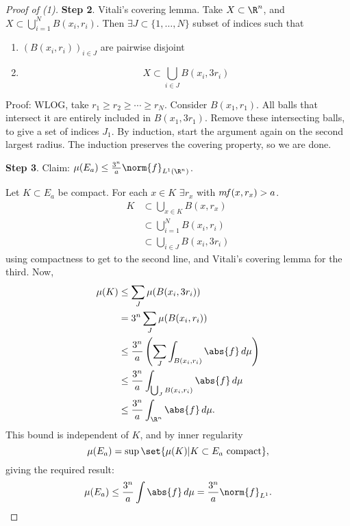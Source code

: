 \documentclass[twoside]{article}
\begin{document}
\begin{proof}[Proof of (1)]
    \textbf{Step 2}. Vitali's covering lemma.
    Take $X \subset \R^n$, and $X \subset \bigcup_{i=1}^N B(x_i, r_i)$.  Then $\exists J \subset \{1, \dotsc, N\}$ subset of indices such that
    \begin{enumerate}[label=(\alph*)]
        \item $(B(x_i, r_i))_{i \in J}$ are pairwise disjoint
        \item
            \begin{equation*}
                X \subset \bigcup_{i \in J} B(x_i, 3 r_i)
            \end{equation*}
    \end{enumerate}
    Proof: WLOG, take $r_1 \geq r_2 \geq \dotsb \geq r_N$. Consider $B(x_1, r_1)$. All balls that intersect it are entirely included in $B(x_1, 3 r_1)$. %
    Remove these intersecting balls, to give a set of indices $J_1$. By induction, start the argument again on the second largest radius.
    The induction preserves the covering property, so we are done.

    \textbf{Step 3}. Claim: $\mu(E_a) \leq \frac{3^n}{a} \norm{f}_{L^1(\R^n)}$.

    Let $K \subset E_a$ be compact.
    For each $x \in K$ $\exists r_x$ with $m \! f(x, r_x) > a$.
    \begin{align*}
        K &\subset \bigcup_{x \in K} B(x, r_x) \\
          &\subset \bigcup_{i=1}^N B(x_i, r_i) \\
          &\subset \bigcup_{i \in J} B(x_i, 3 r_i)
    \end{align*}
    using compactness to get to the second line, and Vitali's covering lemma for the third. Now,
    \begin{align*}
        \mu(K) &\leq \sum_J \mu(B(x_i, 3 r_i)) \\
               &= 3^n \sum_J \mu(B(x_i, r_i)) \\
               &\leq \frac{3^n}{a} \left(\sum_J \int_{B(x_i, r_i)} \abs{f} \, d\mu\right) \\
               &\leq \frac{3^n}{a} \int_{\bigcup_J B(x_i, r_i)} \abs{f} \, d\mu \\
               &\leq \frac{3^n}{a} \int_{\R^n} \abs{f} \, d\mu.
    \end{align*}
    This bound is independent of $K$, and by inner regularity \begin{equation*}\mu(E_a) = \sup\set{\mu(K) | K \subset E_a \text{ compact}},\end{equation*} giving the required result:
    \begin{equation*}
        \mu(E_a) \leq \frac{3^n}{a} \int \abs{f} \, d\mu = \frac{3^n}{a} \norm{f}_{L^1}.
    \end{equation*}


\end{proof}
\end{document}
